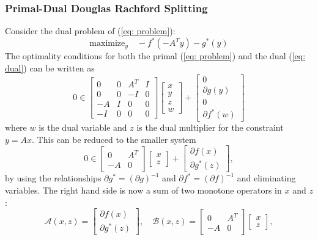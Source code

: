\documentclass[12pt]{article}
\begin{document}
\subsubsection{Primal-Dual Douglas Rachford Splitting} \label{sssec: DRpd}
Consider the dual problem of (\ref{eq: problem}):
\begin{equation}
\text{maximize}_y \quad -f^*(-A^Ty) - g^*(y) \label{eq: dual}
\end{equation}
The optimality conditions for both the primal (\ref{eq: problem}) and
the dual (\ref{eq: dual})  can be written as
\[ 0 \in \left[ \begin{array}{cccc} 0 & 0 & A^T & I \\ 0 & 0 & -I & 0 \\ -A & I & 0 & 0 \\ -I & 0 & 0 & 0 \end{array} \right] \left[ \begin{array}{c} x \\ y \\ z \\ w \end{array} \right] + \left[ \begin{array}{c} 0 \\ \partial g(y) \\ 0 \\ \partial f^* (w) \end{array} \right]
\]
where $w$ is the dual variable and $z$ is the dual multiplier for the constraint $y = Ax.$
This can be reduced to the smaller system
\[ 0 \in \left[ \begin{array}{cc} 0 & A^T \\ -A & 0 \end{array} \right] \left[ \begin{array}{c} x \\ z \end{array} \right] + \left[ \begin{array}{c}  \partial f(x) \\ \partial g^* (z) \end{array} \right],
\]
by using the relationships $\partial g^* = (\partial g)^{-1}$ and
$\partial f^* = (\partial f)^{-1}$ and eliminating variables. The right hand side is now a sum of two monotone operators in $x$ and $z$:
\[ \mathcal{A}(x,z) =  \left[ \begin{array}{c}  \partial f(x)
                                \\ \partial g^* (z) \end{array}
                            \right], \quad\mathcal{B}(x,z) =
                            \left[ \begin{array}{cc} 0 & A^T \\ -A &
                                                                     0 \end{array} \right] \left[ \begin{array}{c} x \\ z \end{array} \right], \]
\end{document}
